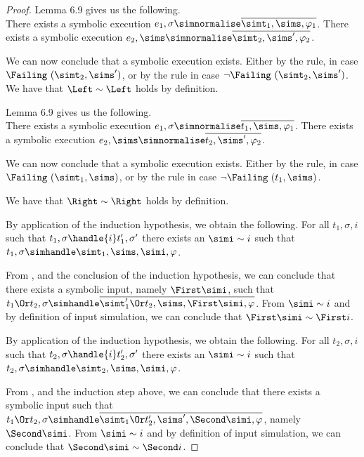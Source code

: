 \begin{proof}
    {
      Lemma 6.9 gives us the following.\\
      There exists a symbolic execution $e_1,\sigma\simnormalise \overline{\simt_1,\sims,\phi_1}$.
      There exists a symbolic execution $e_2,\sims\simnormalise \overline{\simt_2,\sims',\phi_2}$.

      We can now conclude that a symbolic execution exists.
      Either by the  rule, in case $\Failing\ (\simt_2,\sims')$, or by the  rule in case $\neg\Failing\ (\simt_2,\sims')$.
      We have that $\Left\sim \Left$ holds by definition.
    }
    {
    Lemma 6.9 gives us the following.\\
    There exists a symbolic execution $e_1,\sigma\simnormalise\overline{ t_1,\sims,\phi_1}$.
    There exists a symbolic execution $e_2,\sims\simnormalise\overline{ t_2,\sims',\phi_2}$.

    We can now conclude that a symbolic execution exists.
    Either by the  rule, in case $\Failing\ (\simt_1,\sims)$, or by the  rule in case $\neg\Failing\ (t_1,\sims)$.

    We have that $\Right\sim \Right$ holds by definition.
    }

    {
    By application of the induction hypothesis, we obtain the following.
    For all $t_1,\sigma,i$ such that $t_1,\sigma\handle{i}t_1',\sigma'$ there exists an $\simi\sim i$ such that $t_1,\sigma\simhandle \simt_1,\sims,\simi,\phi$.

    From , and the conclusion of the induction hypothesis,
    we can conclude that there exists a symbolic input, namely $\First \simi$, such that $t_1\Or t_2,\sigma\simhandle\overline{\simt_1'\Or t_2,\sims,\First\simi,\phi}$.
    From $\simi\sim i$ and by definition of input simulation, we can conclude that $\First \simi\sim \First i$.
    }

    {
    By application of the induction hypothesis, we obtain the following.
    For all $t_2,\sigma,i$ such that $t_2,\sigma\handle{i}t_2',\sigma'$ there exists an $\simi\sim i$ such that $t_2,\sigma\simhandle\simt_2,\sims,\simi,\phi$.

    From , and the induction step above,
    we can conclude that there exists a symbolic input such that $t_1\Or t_2,\sigma\simhandle\overline{\simt_1\Or t_2',\sims',\Second\simi,\phi}$, namely $\Second \simi$.
    From $\simi\sim i$ and by definition of input simulation, we can conclude that $\Second \simi\sim \Second i$.
    }


\end{proof}
